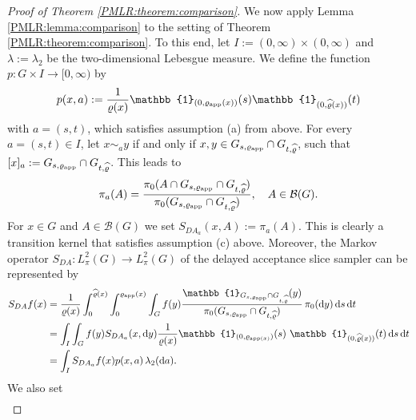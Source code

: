 \documentclass[sn-mathphys-num]{sn-jnl}%
\theoremstyle{thmstyleone}%
\theoremstyle{thmstyletwo}%
\theoremstyle{thmstylethree}%
\newcommand{\rhoapp}{\varrho_{{\rm app}}}
\begin{document}
\begin{appendices}
\begin{proof}[Proof of Theorem \ref{PMLR:theorem:comparison}]
	We now apply Lemma \ref{PMLR:lemma:comparison} to the setting of Theorem \ref{PMLR:theorem:comparison}.
	To this end, let $I:=(0,\infty)\times(0,\infty)$ and $\lambda:=\lambda_2$ be the two-dimensional Lebesgue measure. 
	We define the function $p\colon G\times I \rightarrow [0,\infty)$ by
	\begin{align*}
		p(x,a):=\frac{1}{\varrho(x)}\mathbb{1}_{(0,\varrho_{\textmd{app}}(x))}(s)\mathbb{1}_{(0,\widehat{\varrho}(x))}(t)
	\end{align*}
	with $a=(s,t)$, which satisfies assumption (a) from above. For every $a=(s,t)\in I$, let $x \sim_a y$ if and only if $x,y\in G_{s, \varrho_{\textmd{app}}}\cap G_{t, \widehat{\varrho}}$, such that $[x]_{a}:=G_{s, \varrho_{\textmd{app}}}\cap G_{t, \widehat{\varrho}}$. This leads to
	\begin{align*}
		\pi_{a}(A)=\frac{\pi_0(A\cap G_{s, \varrho_{\textmd{app}}}\cap G_{t, \widehat{\varrho}})}{\pi_0(G_{s, \varrho_{\textmd{app}}}\cap G_{t, \widehat{\varrho}})}, \quad A\in\mathcal{B}(G).
	\end{align*} 
	For $x\in G$ and $A\in \mathcal{B}(G)$ we set 
	$ S_{DA_{{a}}}(x,A):=\pi_{{a}}(A)$.
	This is clearly a transition kernel that satisfies assumption (c) above. 
	Moreover, the Markov operator $S_{DA}: L^2_{\pi}(G) \rightarrow L^2_{\pi}(G)$ of the delayed acceptance slice sampler can be represented by
	\begin{align*}
		S_{DA}f(x) 
		&=\frac{1}{\varrho(x)} \int_0^{\widehat{\varrho}(x)} \int_0^{\rhoapp(x)} \int_G^{} f(y) \frac{\mathbb{1}_{G_{s, \varrho_{\textmd{app}}}\cap G_{t,\widehat{\varrho}}}(y)}{\pi_0(G_{s, \varrho_{\textmd{app}}}\cap G_{t, \widehat{\varrho}})}  \, \pi_{0}(\mathrm{d}y)  \, \mathrm{d}s  \, \mathrm{d}t \\
		&= \int_I \int_G f(y)  S_{DA_{{a}}}(x,\mathrm{d}y) \frac{1}{\varrho(x)}\mathbb{1}_{(0,\varrho_{\textmd{app}(x)})}(s) \ \mathbb{1}_{(0,\widehat{\varrho}(x))}(t)  \, \mathrm{d}s  \, \mathrm{d}t \\ 
		&= \int_I S_{DA_{{a}}}  f(x)  p(x,{a}) \,\lambda_2(\mathrm{d}{a}).
	\end{align*}
	We also set  
	\begin{align*}

\end{align*}
\end{proof}
\end{appendices}
\end{document}
